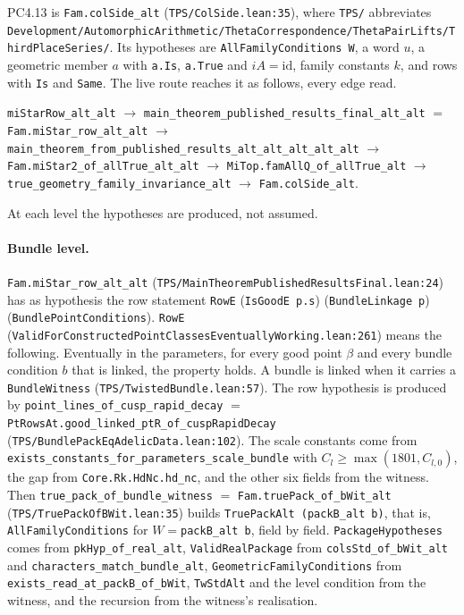 \documentclass[11pt]{article}
\newcommand{\lean}[1]{\nolinkurl{#1}}
\newcommand{\Lpath}[1]{\nolinkurl{#1}}
\theoremstyle{remark}
\begin{document}
PC4.13 is \lean{Fam.colSide_alt} (\Lpath{TPS/ColSide.lean:35}), where \Lpath{TPS/} abbreviates \Lpath{Development/AutomorphicArithmetic/ThetaCorrespondence/ThetaPairLifts/ThirdPlaceSeries/}. Its hypotheses are \lean{AllFamilyConditions}~\lean{W}, a word $u$, a geometric member $a$ with \lean{a.Is}, \lean{a.True} and $iA=\mathrm{id}$, family constants $k$, and rows with \lean{Is} and \lean{Same}. The live route reaches it as follows, every edge read.
\begin{center}\small
\lean{miStarRow_alt_alt} $\to$ \lean{main_theorem_published_results_final_alt_alt} $=$ \lean{Fam.miStar_row_alt_alt} $\to$ \lean{main_theorem_from_published_results_alt_alt_alt_alt_alt} $\to$ \lean{Fam.miStar2_of_allTrue_alt_alt} $\to$ \lean{MiTop.famAllQ_of_allTrue_alt} $\to$ \lean{true_geometry_family_invariance_alt} $\to$ \lean{Fam.colSide_alt}.
\end{center}
At each level the hypotheses are produced, not assumed.

\paragraph{Bundle level.} \lean{Fam.miStar_row_alt_alt} (\Lpath{TPS/MainTheoremPublishedResultsFinal.lean:24}) has as hypothesis the row statement \lean{RowE} (\lean{IsGoodE}~\lean{p.s}) (\lean{BundleLinkage}~\lean{p}) (\lean{BundlePointConditions}). \lean{RowE} (\Lpath{ValidForConstructedPointClassesEventuallyWorking.lean:261}) means the following. Eventually in the parameters, for every good point $\beta$ and every bundle condition $b$ that is linked, the property holds. A bundle is linked when it carries a \lean{BundleWitness} (\Lpath{TPS/TwistedBundle.lean:57}). The row hypothesis is produced by \lean{point_lines_of_cusp_rapid_decay} $=$ \lean{PtRowsAt.good_linked_ptR_of_cuspRapidDecay} (\Lpath{TPS/BundlePackEqAdelicData.lean:102}). The scale constants come from \lean{exists_constants_for_parameters_scale_bundle} with $C_l\ge\max(1801,C_{l,0})$, the gap from \lean{Core.Rk.HdNc.hd_nc}, and the other six fields from the witness. Then \lean{true_pack_of_bundle_witness} $=$ \lean{Fam.truePack_of_bWit_alt} (\Lpath{TPS/TruePackOfBWit.lean:35}) builds \lean{TruePackAlt}~\lean{(packB_alt}~\lean{b)}, that is, \lean{AllFamilyConditions} for $W=$\lean{packB_alt}~\lean{b}, field by field. \lean{PackageHypotheses} comes from \lean{pkHyp_of_real_alt}, \lean{ValidRealPackage} from \lean{colsStd_of_bWit_alt} and \lean{characters_match_bundle_alt}, \lean{GeometricFamilyConditions} from \lean{exists_read_at_packB_of_bWit}, \lean{TwStdAlt} and the level condition from the witness, and the recursion from the witness's realisation.
\end{document}
